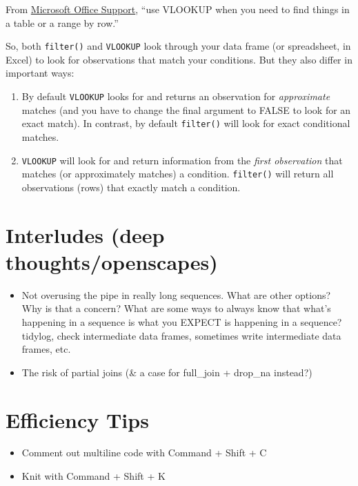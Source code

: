 \documentclass[]{book}
\providecommand{\tightlist}{%
  \setlength{\itemsep}{0pt}\setlength{\parskip}{0pt}}
\begin{document}
From \href{https://support.office.com/en-us/article/vlookup-function-0bbc8083-26fe-4963-8ab8-93a18ad188a1}{Microsoft Office Support}, ``use VLOOKUP when you need to find things in a table or a range by row.''

So, both \texttt{filter()} and \texttt{VLOOKUP} look through your data frame (or spreadsheet, in Excel) to look for observations that match your conditions. But they also differ in important ways:

\begin{enumerate}
\def\labelenumi{(\arabic{enumi})}
\item
  By default \texttt{VLOOKUP} looks for and returns an observation for \emph{approximate} matches (and you have to change the final argument to FALSE to look for an exact match). In contrast, by default \texttt{filter()} will look for exact conditional matches.
\item
  \texttt{VLOOKUP} will look for and return information from the \emph{first observation} that matches (or approximately matches) a condition. \texttt{filter()} will return all observations (rows) that exactly match a condition.
\end{enumerate}

\hypertarget{interludes-deep-thoughtsopenscapes}{%
\section{Interludes (deep thoughts/openscapes)}\label{interludes-deep-thoughtsopenscapes}}

\begin{itemize}
\item
  Not overusing the pipe in really long sequences. What are other options? Why is that a concern? What are some ways to always know that what's happening in a sequence is what you EXPECT is happening in a sequence? tidylog, check intermediate data frames, sometimes write intermediate data frames, etc.
\item
  The risk of partial joins (\& a case for full\_join + drop\_na instead?)
\end{itemize}

\hypertarget{efficiency-tips-4}{%
\section{Efficiency Tips}\label{efficiency-tips-4}}

\begin{itemize}
\tightlist
\item
  Comment out multiline code with Command + Shift + C
\item
  Knit with Command + Shift + K
\end{itemize}
\end{document}
